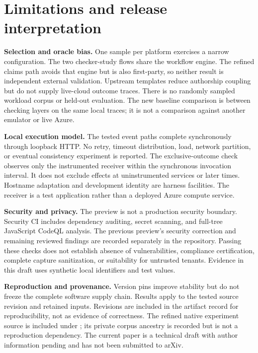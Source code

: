 \documentclass[10pt,a4paper]{article}
\begin{document}
\section{Limitations and release interpretation}
\textbf{Selection and oracle bias.} One sample per platform exercises a narrow configuration. The two checker-study flows share the workflow engine. The refined claims path avoids that engine but is also first-party, so neither result is independent external validation. Upstream templates reduce authorship coupling but do not supply live-cloud outcome traces. There is no randomly sampled workload corpus or held-out evaluation. The new baseline comparison is between checking layers on the same local traces; it is not a comparison against another emulator or live Azure.

\textbf{Local execution model.} The tested event paths complete synchronously through loopback HTTP. No retry, timeout distribution, load, network partition, or eventual consistency experiment is reported. The exclusive-outcome check observes only the instrumented receiver within the synchronous invocation interval. It does not exclude effects at uninstrumented services or later times. Hostname adaptation and development identity are harness facilities. The receiver is a test application rather than a deployed Azure compute service.

\textbf{Security and privacy.} The preview is not a production security boundary. Security CI includes dependency auditing, secret scanning, and full-tree JavaScript CodeQL analysis. The previous preview's security correction and remaining reviewed findings are recorded separately in the repository. Passing these checks does not establish absence of vulnerabilities, compliance certification, complete capture sanitization, or suitability for untrusted tenants. Evidence in this draft uses synthetic local identifiers and test values.

\textbf{Reproduction and provenance.} Version pins improve stability but do not freeze the complete software supply chain. Results apply to the tested source revision and retained inputs. Revisions are included in the artifact record for reproducibility, not as evidence of correctness. The refined native experiment source is included under ; its private corpus ancestry is recorded but is not a reproduction dependency. The current paper is a technical draft with author information pending and has not been submitted to arXiv.
\end{document}
